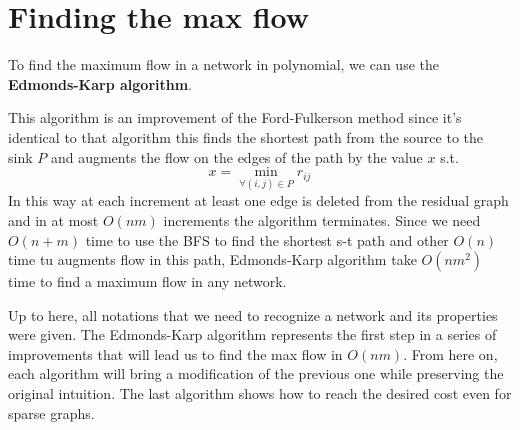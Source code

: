 \section{Finding the max flow}
To find the maximum flow in a network in polynomial, we can use the \textbf{Edmonds-Karp algorithm}\cite{Edmonds_Karp}.

This algorithm is an improvement of the Ford-Fulkerson\cite{FordFulkerson} method since it's identical to that algorithm this finds the shortest path from the source to the sink $P$ and augments the flow on the edges of the path by the value $x$ s.t.
\[x = \min_{\forall (i,j)\in P} r_{ij}\]
In this way at each increment at least one edge is deleted from the residual graph and in at most $O(nm)$ increments the algorithm terminates.
Since we need $O(n+m)$ time to use the BFS to find the shortest s-t path and other $O(n)$ time tu augments flow in this path, Edmonds-Karp algorithm take $O(nm^2)$ time to find a maximum flow in any network.

Up to here, all notations that we need to recognize a network and its properties were given. The Edmonds-Karp algorithm represents the first step in a series of improvements that will lead us to find the max flow in $O(nm)$. From here on, each algorithm will bring a modification of the previous one while preserving the original intuition. The last algorithm shows how to reach the desired cost even for sparse graphs.

\cleardoublepage
